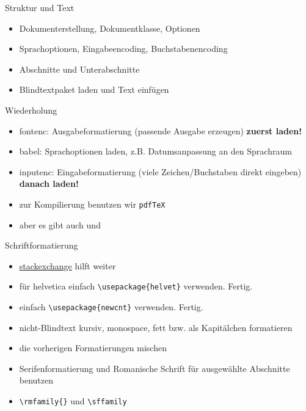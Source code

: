 \begin{frame}{Struktur und Text}
    \begin{itemize}[<+->]
        \item Dokumenterstellung, Dokumentklasse, Optionen
        \item Sprachoptionen, Eingabeencoding, Buchstabenencoding
        \item Abschnitte und Unterabschnitte
        \item Blindtextpaket laden und Text einfügen
    \end{itemize}
\end{frame}

\begin{frame}{Wiederholung}
    \begin{itemize}[<+->]
        \item fontenc: Ausgabeformatierung (passende Ausgabe erzeugen) \textbf{zuerst laden!}
        \item babel: Sprachoptionen laden, z.B. Datumsanpassung an den Sprachraum
        \item inputenc: Eingabeformatierung (viele Zeichen/Buchstaben direkt eingeben) \textbf{danach laden!}
        \item zur Kompilierung benutzen wir \texttt{pdfTeX}
        \item aber es gibt auch \XeTeX und \LuaTeX
    \end{itemize}
\end{frame}

\begin{frame}[fragile]{Schriftformatierung}
    \begin{itemize}
        \item \href{https://tex.stackexchange.com/questions/59403/what-font-packages-are-installed-in-tex-live/59405#59405}{stackexchange} hilft weiter
        \item für helvetica einfach \lstinline|\usepackage{helvet}| verwenden. Fertig.
        \item einfach \lstinline|\usepackage{newcnt}| verwenden. Fertig.
        \item nicht-Blindtext kursiv, monospace, fett bzw. als Kapitälchen formatieren
        \item die vorherigen Formatierungen mischen
        \item Serifenformatierung und Romanische Schrift für ausgewählte Abschnitte benutzen
        \item \lstinline|\rmfamily{}| und \lstinline|\sffamily|
    \end{itemize}
\end{frame}

